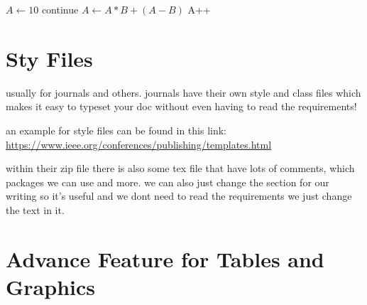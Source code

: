 \documentclass{article} %
\begin{document}
    \begin{algorithmic}
            \State $A \gets 10$
            \State continue 
        \Else
                \State $A \gets A*B+(A-B)$
                \State A++
            \EndWhile
        \EndIf
    
    \label{alg:my_alg}
    \end{algorithmic}


\section{Sty Files}

    usually for journals and others. journals have their own style and class files which makes it easy to typeset your doc without even having to read the requirements!
    
    \noindent an example for style files can be found in this link: \\ \url{https://www.ieee.org/conferences/publishing/templates.html}
    
    within their zip file there is also some tex file that have lots of comments, which packages we can use and more. we can also just change the section for our writing so it's useful and we dont need to read the requirements we just change the text in it.
    
    
\section{Advance Feature for Tables and Graphics}
    
\end{document}
